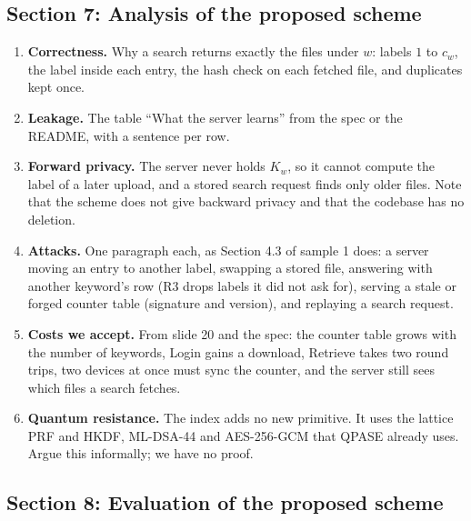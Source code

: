\documentclass[11pt,a4paper]{article}
\begin{document}
\subsection{Section 7: Analysis of the proposed scheme}

\begin{enumerate}
  \item \textbf{Correctness.} Why a search returns exactly the files under $w$: labels $1$ to $c_w$, the label
        inside each entry, the hash check on each fetched file, and duplicates kept once.
  \item \textbf{Leakage.} The table ``What the server learns'' from the spec or the README, with a sentence per row.
  \item \textbf{Forward privacy.} The server never holds $K_w$, so it cannot compute the label of a later upload, and
        a stored search request finds only older files. Note that the scheme does not give backward privacy and
        that the codebase has no deletion.
  \item \textbf{Attacks.} One paragraph each, as Section 4.3 of sample 1 does: a server moving an entry to another
        label, swapping a stored file, answering with another keyword's row (R3 drops labels it did not ask for),
        serving a stale or forged counter table (signature and version), and replaying a search request.
  \item \textbf{Costs we accept.} From slide 20 and the spec: the counter table grows with the number of keywords,
        Login gains a download, Retrieve takes two round trips, two devices at once must sync the counter, and the
        server still sees which files a search fetches.
  \item \textbf{Quantum resistance.} The index adds no new primitive. It uses the lattice PRF and HKDF, ML-DSA-44
        and AES-256-GCM that QPASE already uses. Argue this informally; we have no proof.
\end{enumerate}

\subsection{Section 8: Evaluation of the proposed scheme}
\end{document}
